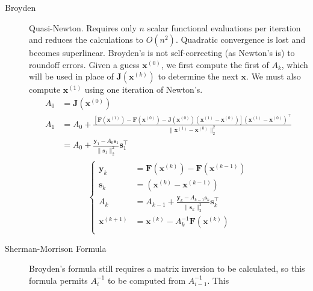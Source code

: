 \documentclass[8pt]{article}
\begin{document}
\begin{multicols}{2}
\begin{description}
    \item[Broyden] Quasi-Newton. Requires only $n$ scalar functional evaluations per iteration and
      reduces the calculations to $O(n^2)$. Quadratic convergence is lost and becomes
      superlinear. Broyden's is not self-correcting (as Newton's is) to roundoff errors. Given a
      guess $\mathbf{x}^{(0)}$, we first compute the first of $A_{k}$, which will be used in place
      of $\mathbf{J}(\mathbf{x}^{(k)})$ to determine the next $\mathbf{x}$. We must also compute
      $\mathbf{x}^{(1)}$ using one iteration of Newton's.
      \begin{equation*}
        \begin{aligned}
          A_0&=\mathbf{J}(\mathbf{x}^{(0)}) \\
          A_1&=A_0+\frac{[\mathbf{F}(\mathbf{x}^{(1)}) -
            \mathbf{F}(\mathbf{x}^{(0)}) -
            \mathbf{J}(\mathbf{x}^{(0)})(\mathbf{x}^{(1)}-\mathbf{x}^{(0)})](\mathbf{x}^{(1)}-\mathbf{x}^{(0)})^\top}{\|\mathbf{x}^{(1)}-\mathbf{x}^{(0)}\|^2_2} \\
          &=A_0+\frac{\mathbf{y}_1-A_{0}\mathbf{s}_1}{\|\mathbf{s}_1\|^2_2}\mathbf{s}_1^\top \\
        \end{aligned}
      \end{equation*}
      \begin{equation*}
        \left\{
        \begin{aligned}
          \mathbf{y}_k&=\mathbf{F}(\mathbf{x}^{(k)})-\mathbf{F}(\mathbf{x}^{(k-1)}) \\
          \mathbf{s}_k&=(\mathbf{x}^{(k)}-\mathbf{x}^{(k-1)}) \\
          A_k&=A_{k-1}+\frac{\mathbf{y}_k-A_{k-1}\mathbf{s}_k}{\|\mathbf{s}_k\|^2_2}\mathbf{s}_k^\top \\
          \mathbf{x}^{(k+1)}&=\mathbf{x}^{(k)}-A_k^{-1}\mathbf{F}(\mathbf{x}^{(k)}) \\
        \end{aligned}
        \right.
      \end{equation*}
    \item[Sherman-Morrison Formula] Broyden's formula still requires a matrix inversion to be
      calculated, so this formula permits $A_i^{-1}$ to be computed from $A_{i-1}^{-1}$. This

\end{description}
\end{multicols}
\end{document}
